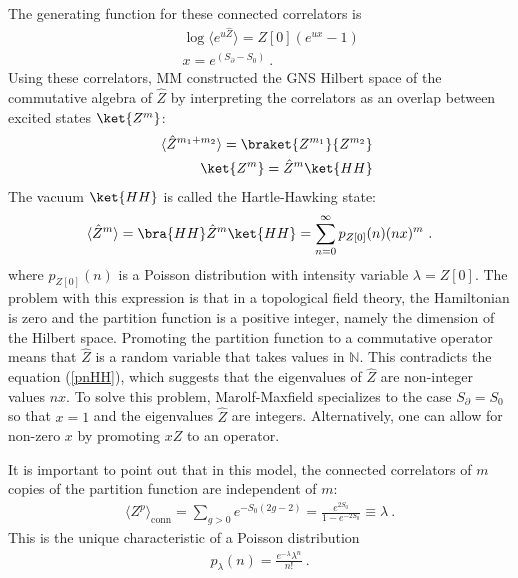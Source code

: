 \documentclass[a4paper,11pt]{article}
\theoremstyle{definition}
\numberwithin{equation}{section}
\newcommand{\lb}{\left(}
\newcommand{\rb}{\right)}
\newcommand{\p}{\partial}
\newcommand{\nn}{\nonumber}
\begin{document}
The generating function for these connected correlators is
\begin{eqnarray}
  &&\log\langle e^{u \hat{Z}}\rangle=Z[0]\lb e^{u x}-1 \rb\nn\\
   && x= e^{(S_\p-S_0)}\ .
\end{eqnarray}
Using these correlators, MM constructed the GNS Hilbert space of the commutative algebra of $\hat{Z}$ by interpreting the correlators as an overlap between excited states $\ket{Z^m}$:
\begin{eqnarray}
    &&\langle \hat{Z}^{m_1+m_2}\rangle=\braket{Z^{m_1}}{Z^{m_2}}\nn\\
    &&\ket{Z^m}=\hat{Z}^m\ket{HH}
\end{eqnarray}
The vacuum $\ket{HH}$ is called the Hartle-Hawking state:
\begin{eqnarray}\label{pnHH}
    \langle \hat{Z}^m\rangle=\bra{HH}\hat{Z}^m\ket{HH}=\sum_{n=0}^\infty p_{Z[0]}(n) (nx)^m\ .
\end{eqnarray}
where $p_{Z[0]}(n)$ is a Poisson distribution with intensity variable $\lambda=Z[0]$. The problem with this expression is that in a topological field theory, the Hamiltonian is zero and the partition function is a positive integer, namely the dimension of the Hilbert space. Promoting the partition function to a commutative operator means that $\hat{Z}$ is a random variable that takes values in $\mathbb{N}$. This contradicts the equation (\ref{pnHH}), which suggests that the eigenvalues of $\hat{Z}$ are non-integer values $nx$. To solve this problem, Marolf-Maxfield specializes to the case $S_\p=S_0$ so that $x=1$ and the eigenvalues $\hat{Z}$ are integers. Alternatively, one can allow for non-zero $x$ by promoting $xZ$ to an operator. 


It is important to point out that in this model, the connected correlators of $m$ copies of the partition function are independent of $m$: 
\begin{eqnarray}\label{connectedZp}
    \langle Z^p\rangle_\text{conn}=\sum_{g>0}e^{-S_0(2g-2)}=\frac{e^{2S_0}}{1-e^{-2S_0}}\equiv \lambda\ .
\end{eqnarray}
This is the unique characteristic of a Poisson distribution
\begin{eqnarray}
    p_\lambda(n)=\frac{e^{-\lambda}\lambda^n}{n!}\ .
\end{eqnarray}
\end{document}
